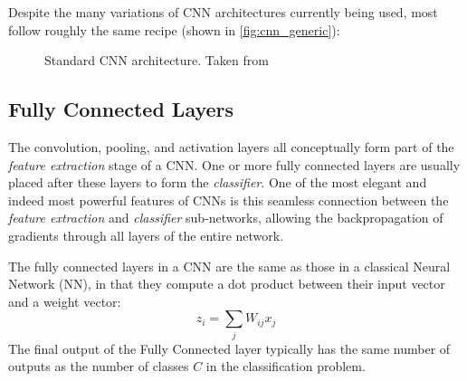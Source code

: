   Despite the many variations of CNN architectures currently being used, most
  follow roughly the same recipe (shown in \autoref{fig:cnn_generic}):
  \begin{figure}
    \centering
      \caption[Standard CNN architecture]
              {Standard CNN architecture. Taken
              from~\citep{lecun_gradient-based_1998}}\label{fig:cnn_generic}
  \end{figure}

\subsection{Fully Connected Layers}\label{sec:cnn_fullyconnected}
  The convolution, pooling, and activation layers all
  conceptually form part of the \emph{feature extraction} stage of a CNN. One
  or more fully connected layers are usually placed after these layers to form
  the \emph{classifier}. One of the most elegant and indeed most powerful
  features of CNNs is this seamless connection between the \emph{feature
  extraction} and \emph{classifier} sub-networks, allowing the backpropagation
  of gradients through all layers of the entire network.

  The fully connected layers in a CNN are the same as those in a classical
  Neural Network (NN), in that they compute a dot product between their input
  vector and a weight vector:
  \begin{equation}
    z_i = \sum_{j} W_{ij}x_j
  \end{equation}
  The final output of the Fully Connected layer typically has the same number
  of outputs as the number of classes $C$ in the classification problem.

